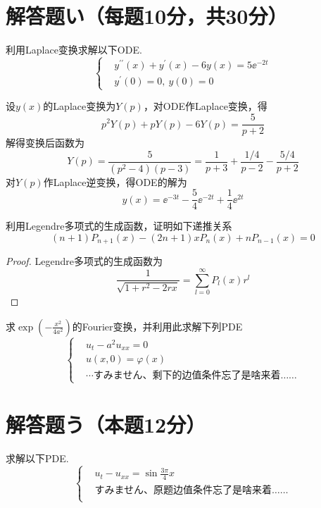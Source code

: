 \section{解答题い（每题10分，共30分）}
{
\begin{exercise}
    利用Laplace变换求解以下ODE.
    $$
    \left\{
        \begin{aligned}
            &y^{\prime\prime}\left(x\right)+y^{\prime}\left(x\right)-6y\left(x\right)=5\ee^{-2t}\\
            &y^{\prime}\left(0\right)=0,\ y\left(0\right)=0
        \end{aligned}
    \right.
    $$
\end{exercise}
\begin{solution}
    设$y\left(x\right)$的Laplace变换为$Y\left(p\right)$，对ODE作Laplace变换，得
    $$p^2Y\left(p\right)+pY\left(p\right)-6Y\left(p\right)=\frac{5}{p+2}$$
    解得变换后函数为
    $$Y\left(p\right)=\frac{5}{\left(p^2-4\right)\left(p-3\right)}=\frac{1}{p+3}+\frac{1/4}{p-2}-\frac{5/4}{p+2}$$
    对$Y\left(p\right)$作Laplace逆变换，得ODE的解为
    $$y\left(x\right)=\ee^{-3t}-\frac{5}{4}\ee^{-2t}+\frac{1}{4}\ee^{2t}$$
\end{solution}

\begin{exercise}
    利用Legendre多项式的生成函数，证明如下递推关系
    $$\left(n+1\right)P_{n+1}\left(x\right)-\left(2n+1\right)xP_n\left(x\right)+nP_{n-1}\left(x\right)=0$$
\end{exercise}
\begin{proof}
    Legendre多项式的生成函数为
    $$\frac{1}{\sqrt{1+r^2-2rx}}=\sum_{l=0}^{\infty}{P_l\left(x\right)r^l}$$
\end{proof}

\begin{exercise}
    求$\exp\left(-\frac{x^2}{4a^2}\right)$的Fourier变换，并利用此求解下列PDE
    $$
    \left\{
        \begin{aligned}
            &u_t-a^2u_{xx}=0\\
            &u\left(x,0\right)=\varphi\left(x\right)\\
            &\cdots \mbox{すみません、剩下的边值条件忘了是啥来着……}
        \end{aligned}
    \right.
    $$
\end{exercise}
}
\section{解答题う（本题12分）}
{
    \begin{exercise}
    求解以下PDE.
    $$\left\{
    \begin{aligned}
        &u_t-u_{xx}=\sin{\frac{3\pi}{4}x}\\
        &\mbox{すみません、原题边值条件忘了是啥来着……}\\
    \end{aligned}
    \right.
    $$
    \end{exercise}
}